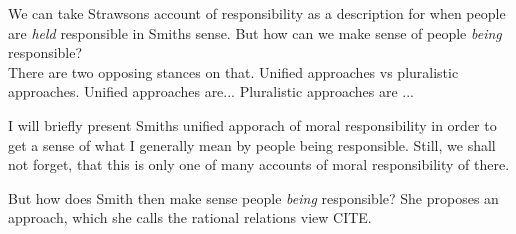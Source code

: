 \documentclass{article}
\begin{document}

We can take Strawsons account of responsibility as a description for when
people are \textit{held} responsible in Smiths sense. But how can we make sense
of people \textit{being} responsible?\\

There are two opposing stances on that. Unified approaches vs pluralistic
approaches. Unified approaches are...
Pluralistic approaches are ...

I will briefly present Smiths unified apporach of moral responsibility in order
to get a sense of what I generally mean by people being responsible. Still, we
shall not forget, that this is only one of many accounts of moral responsibility
of there.

But how does Smith then
make sense people \textit{being} responsible? She proposes an approach, which
she calls the rational relations view CITE.
\end{document}
